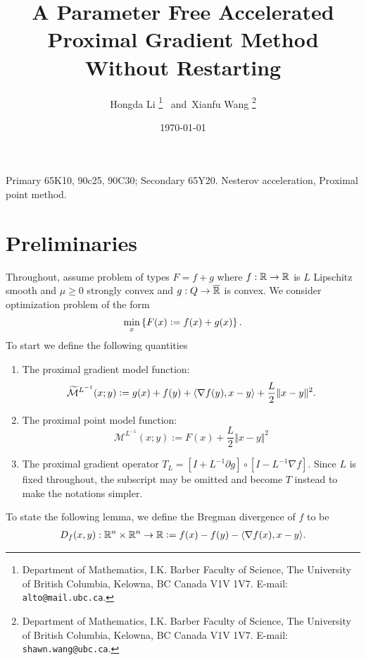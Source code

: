 \documentclass[12pt]{article}
\begin{document}
\title{{\selectfont 
        A Parameter Free Accelerated Proximal Gradient Method Without Restarting
    }}

\author{
    Hongda Li
    \thanks{Department of Mathematics, I.K. Barber Faculty of Science,
    The University of British Columbia, Kelowna, BC Canada V1V 1V7. E-mail:  \texttt{alto@mail.ubc.ca}.}~ and~Xianfu Wang
    \thanks{Department of Mathematics, I.K. Barber Faculty of Science,
    The University of British Columbia, Kelowna, BC Canada V1V 1V7. E-mail:  \texttt{shawn.wang@ubc.ca}.}
}

\date{\today}

\maketitle


\begin{abstract} 
    \noindent
    
    
\end{abstract}

Primary 65K10, 90c25, 90C30; Secondary 65Y20. 
 Nesterov acceleration, Proximal point method. 

\section{Preliminaries}
    Throughout, assume problem of types $F = f + g$ where $f: \mathbb R \rightarrow \mathbb R$ is $L$ Lipschitz smooth and $\mu \ge 0$ strongly convex and $g: Q \rightarrow \overline {\mathbb R}$ is convex. 
    We consider optimization problem of the form
    \begin{align*}
        \min_x \left\lbrace
            F(x) \vcentcolon= f(x) + g(x)
        \right\rbrace. 
    \end{align*}
    To start we define the following quantities
    \begin{enumerate}
        \item The proximal gradient model function: 
        $$
            \widetilde{\mathcal M}^{L^{-1}}
            (x; y) \vcentcolon=
            g(x) + f(y) + \langle \nabla f(y), x - y\rangle 
            + \frac{L}{2}\Vert x - y\Vert^2. 
        $$
        \item The proximal point model function: 
        $$
            \mathcal M^{L^{-1}}(x; y) := F(x) + \frac{L}{2}\Vert x - y\Vert^2
        $$
        \item The proximal gradient operator $T_L = [I + L^{-1}\partial g]\circ [I - L^{-1}\nabla f]$. Since $L$ is fixed throughout, the subscript may be omitted and become $T$ instead to make the notations simpler. 
    \end{enumerate}
    To state the following lemma, we define the Bregman divergence of $f$ to be 
    \begin{align*}
        D_f(x, y): \mathbb R^n \times \mathbb R^n \rightarrow \mathbb R 
        \vcentcolon= f(x) - f(y) - \langle \nabla f(x), x - y\rangle. 
    \end{align*}
    
\end{document}
